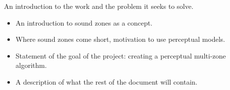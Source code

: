 An introduction to the work and the problem it seeks to solve.
\begin{itemize}
    \item An introduction to sound zones as a concept.
    \item Where sound zones come short, motivation to use perceptual models.
    \item Statement of the goal of the project: creating a perceptual multi-zone algorithm.
    \item A description of what the rest of the document will contain.
 \end{itemize}
